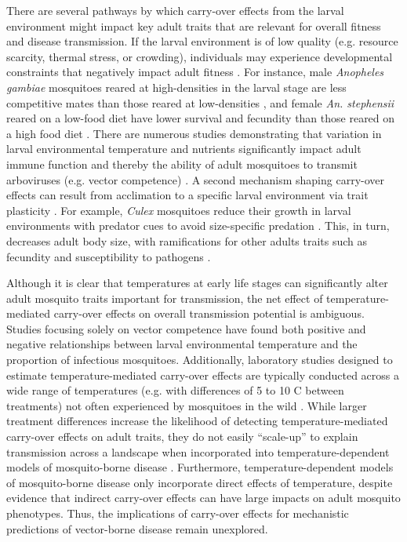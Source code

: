 \documentclass[12pt]{article}
\begin{document}
There are several pathways by which carry-over effects from the larval environment might impact key adult traits that are relevant for overall fitness and disease transmission. If the larval environment is of low quality (e.g. resource scarcity, thermal stress, or crowding), individuals may experience developmental constraints that negatively impact adult fitness \citep{inger2010}. For instance, male \textit{Anopheles gambiae} mosquitoes reared at high-densities in the larval stage are less competitive mates than those reared at low-densities \citep{nghabi2005}, and female \textit{An. stephensii} reared on a low-food diet have lower survival and fecundity than those reared on a high food diet \citep{moller-jacobs2014, shapiro2016}. There are numerous studies demonstrating that variation in larval environmental temperature and nutrients significantly impact adult immune function \citep{muturi2012, price2015} and thereby the ability of adult mosquitoes to transmit arboviruses (e.g. vector competence) \citep{grimstad1991, muturi2012a, muturi2011d, alto2013, vantaux2016, buckner2016}. A second mechanism shaping carry-over effects can result from acclimation to a specific larval environment via trait plasticity \citep{monaghan2008}. For example, \textit{Culex} mosquitoes reduce their growth in larval environments with predator cues to avoid size-specific predation \citep{jourdan2016}. This, in turn, decreases adult body size, with ramifications for other adults traits such as fecundity \citep{lounibos2002} and susceptibility to pathogens \citep{paulson1991}.

Although it is clear that temperatures at early life stages can significantly alter adult mosquito traits important for transmission, the net effect of temperature-mediated carry-over effects on overall transmission potential is ambiguous. Studies focusing solely on vector competence have found both positive \citep{muturi2011c} and negative \citep{muturi2011a} relationships between larval environmental temperature and the proportion of infectious mosquitoes. Additionally, laboratory studies designed to estimate temperature-mediated carry-over effects are typically conducted across a wide range of temperatures (e.g. with differences of 5 to 10 \degree C between treatments) not often experienced by mosquitoes in the wild \citep{cator2013}. While larger treatment differences increase the likelihood of detecting temperature-mediated carry-over effects on adult traits, they do not easily ``scale-up'' to explain transmission across a landscape when incorporated into temperature-dependent models of mosquito-borne disease \citep{pascual2006, mordecai2017, reiner2013}. Furthermore, temperature-dependent models of mosquito-borne disease only incorporate direct effects of temperature, despite evidence that indirect carry-over effects can have large impacts on adult mosquito phenotypes. Thus, the implications of carry-over effects for mechanistic predictions of vector-borne disease remain unexplored.
\end{document}
